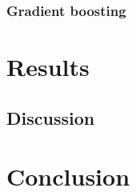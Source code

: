\documentclass{article}
\begin{document}
\subsubsection{Gradient boosting}

\section{Results}

\subsection{Discussion}

\section{Conclusion}

\footnotesize{
\begin{spacing}{.85 }


\end{spacing}
}
\end{document}
